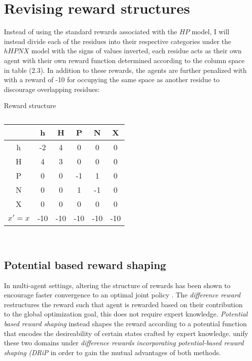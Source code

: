 \section{Revising reward structures}
Instead of using the standard rewards associated with the $HP$ model, 
I will instead divide each of the residues into their respective categories
under the $hHPNX$ model with the signs of values inverted, each residue acts as their own agent with their own
reward function determined according to the column space in table (2.3). In
addition to these rewards, the agents are further penalized with with a reward
of -10 for occupying the same space as another residue to discourage overlapping residues:
\begin{table}[!htb]
    \caption{Reward structure}
    \begin{center}
        \caption{}
        \begin{tabular}{|c || c | c | c | c | c|}
            \hline
             & h & H & P & N & X \\
            \hline
            h & -2 & 4 & 0 & 0 & 0 \\
            \hline
            H & 4 & 3 & 0 & 0 & 0 \\
            \hline
            P & 0 & 0 & -1 & 1 & 0\\
            \hline
            N & 0 & 0 & 1 & -1 & 0\\
            \hline
            X & 0 & 0 & 0 & 0 & 0\\ 
            \hline
            $x' = x$ & -10 & -10 & -10 & -10 & -10\\
            \hline
        \end{tabular}
    \end{center}
\end{table}\\
\subsection{Potential based reward shaping}
In multi-agent settings, altering the structure of rewards has been shown to 
encourage faster convergence to an optimal joint policy \cite{Devlin2014}.
The \emph{difference reward} restructures the reward such that agent is rewarded
based on their contribution to the global optimization goal, this does not
require expert knowledge. \emph{Potential based reward
shaping} instead shapes the reward according to a potential function that encodes the desireability
of certain states crafted by expert knowledge. \cite{Devlin2014} unify these two domains
under \emph{difference rewards incorporating potential-based reward shaping (DRiP} in order to gain the mutual advantages of both methods.\\

